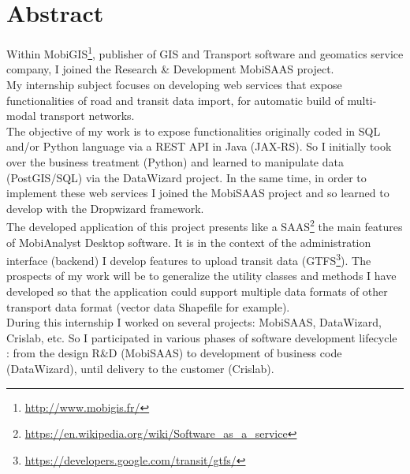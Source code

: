 \chapter*{Abstract}

Within MobiGIS\footnote{\url{http://www.mobigis.fr/}}, publisher of GIS and Transport software and geomatics service company, I joined the Research \& Development \og MobiSAAS \fg project. \\

My internship subject focuses on developing web services that expose functionalities of road and transit data import, for automatic build of multi-modal transport networks. \\

The objective of my work is to expose functionalities originally coded in SQL and/or Python language via a REST API in Java (JAX-RS). So I initially took over the business treatment (Python) and learned to manipulate data (PostGIS/SQL) via the \og DataWizard \fg project. In the same time, in order to implement these web services I joined the \og MobiSAAS \fg project and so learned to develop with the \og Dropwizard \fg framework. \\

The developed application of this project presents like a SAAS\footnote{\url{https://en.wikipedia.org/wiki/Software_as_a_service}} the main features of MobiAnalyst Desktop software. It is in the context of the administration interface (backend) I develop features to upload transit data (GTFS\footnote{\url{https://developers.google.com/transit/gtfs/}}). The prospects of my work will be to generalize the utility classes and methods I have developed so that the application could support multiple data formats of other transport data format (vector data \og Shapefile \fg for example). \\

During this internship I worked on several projects: MobiSAAS, DataWizard, Crislab, etc. So I participated in various phases of software development lifecycle : from the design R\&D (MobiSAAS) to development of business code (DataWizard), until delivery to the customer (Crislab). \\